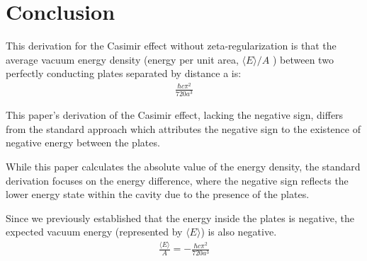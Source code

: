 \section{Conclusion}

This derivation for the Casimir effect without zeta-regularization is that the average vacuum energy density 
(energy per unit area, \(\langle E \rangle/A\) ) between two perfectly conducting plates separated by distance a is:
\begin{align}\frac{\hbar c \pi^2}{720 a^3}\end{align}

This paper's derivation of the Casimir effect, lacking the negative sign,  
differs from the standard approach which attributes the negative sign to the existence of negative energy between the plates. 

While this paper calculates the absolute value of the energy density, the standard derivation focuses on the energy difference, 
where the negative sign reflects the lower energy state within the cavity due to the presence of the plates.

Since we previously established that the energy inside the plates is negative, 
the expected vacuum energy (represented by $\langle E \rangle$) is also negative.
\begin{align}
    \frac{\langle E \rangle}{A} = -\frac{\hbar c \pi^2}{720 a^3}
\end{align}
